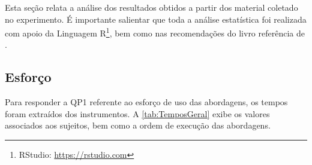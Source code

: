 Esta seção relata a análise dos resultados obtidos a partir dos material coletado no experimento. 
É importante salientar que toda a análise estatística foi realizada com apoio da Linguagem R\footnote{RStudio: \url{https://rstudio.com}}, bem como nas recomendações do livro referência de .

\subsection{Esforço}

Para responder a \ac{QP}1 referente ao esforço de uso das abordagens, os tempos foram extraídos dos instrumentos. 
A \autoref{tab:TemposGeral} exibe os valores associados aos sujeitos, bem como a ordem de execução das abordagens.

